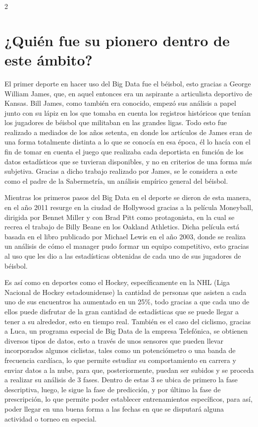 \documentclass[12pt,spanish,Letterpaper,openany]{book}
\begin{document}
\begin {multicols}{2}
\hypertarget{quiuxe9n-fue-su-pionero-dentro-de-este-uxe1mbito}{%
\section{¿Quién fue su pionero dentro de este ámbito?}\label{quiuxe9n-fue-su-pionero-dentro-de-este-uxe1mbito}}

El primer deporte en hacer uso del Big Data fue el béisbol, esto gracias a George William James, que, en aquel entonces era un aspirante a articulista deportivo de Kansas. Bill James, como también era conocido, empezó sus análisis a papel junto con su lápiz en los que tomaba en cuenta los registros históricos que tenían los jugadores de béisbol que militaban en las grandes ligas. Todo esto fue realizado a mediados de los años setenta, en donde los artículos de James eran de una forma totalmente distinta a lo que se conocía en esa época, él lo hacía con el fin de tomar en cuenta el juego que realizaba cada deportista en función de los datos estadísticos que se tuvieran disponibles, y no en criterios de una forma más subjetiva. Gracias a dicho trabajo realizado por James, se le considera a este como el padre de la Sabermetría, un análisis empírico general del béisbol.

Mientras los primeros pasos del Big Data en el deporte se dieron de esta manera, en el año 2011 resurge en la ciudad de Hollywood gracias a la película Moneyball, dirigida por Bennet Miller y con Brad Pitt como protagonista, en la cual se recrea el trabajo de Billy Beane en los Oakland Athletics. Dicha película está basada en el libro publicado por Michael Lewis en el año 2003, donde se realiza un análisis de cómo el manager pudo formar un equipo competitivo, esto gracias al uso que les dio a las estadísticas obtenidas de cada uno de sus jugadores de béisbol.

Es así como en deportes como el Hockey, específicamente en la NHL (Liga Nacional de Hockey estadounidense) la cantidad de personas que asisten a cada uno de sus encuentros ha aumentado en un 25\%, todo gracias a que cada uno de ellos puede disfrutar de la gran cantidad de estadísticas que se puede llegar a tener a su alrededor, esto en tiempo real. También es el caso del ciclismo, gracias a Luca, un programa especial de Big Data de la empresa Telefónica, se obtienen diversos tipos de datos, esto a través de unos sensores que pueden llevar incorporados algunos ciclistas, tales como un potenciómetro o una banda de frecuencia cardíaca, lo que permite estudiar su comportamiento en carrera y enviar datos a la nube, para que, posteriormente, puedan ser subidos y se proceda a realizar su análisis de 3 fases. Dentro de estas 3 se ubica de primero la fase descriptiva, luego, le sigue la fase de predicción, y por último la fase de prescripción, lo que permite poder establecer entrenamientos específicos, para así, poder llegar en una buena forma a las fechas en que se disputará alguna actividad o torneo en especial.


\end{multicols}
\end{document}
